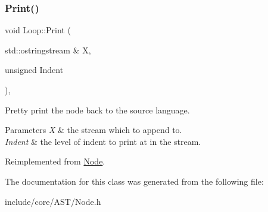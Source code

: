 \mbox{\label{class_loop_aa2907209a033f57b7ca8bbee857b2bfe}} 
\subsubsection{\texorpdfstring{Print()}{Print()}}
{\footnotesize\ttfamily void Loop\+::\+Print (\begin{DoxyParamCaption}\item[{std\+::ostringstream \&}]{X,  }\item[{unsigned}]{Indent }\end{DoxyParamCaption})\hspace{0.3cm}{\ttfamily [override]}, {\ttfamily [virtual]}}

Pretty print the node back to the source language. 
\begin{DoxyParams}{Parameters}
{\em X} & the stream which to append to. \\
\hline
{\em Indent} & the level of indent to print at in the stream. \\
\hline
\end{DoxyParams}


Reimplemented from \mbox{\hyperlink{class_node_a5325b760a6e6fe94227c0cff53af2c45}{Node}}.



The documentation for this class was generated from the following file\+:\begin{DoxyCompactItemize}
\item 
include/core/\+A\+S\+T/Node.\+h\end{DoxyCompactItemize}

